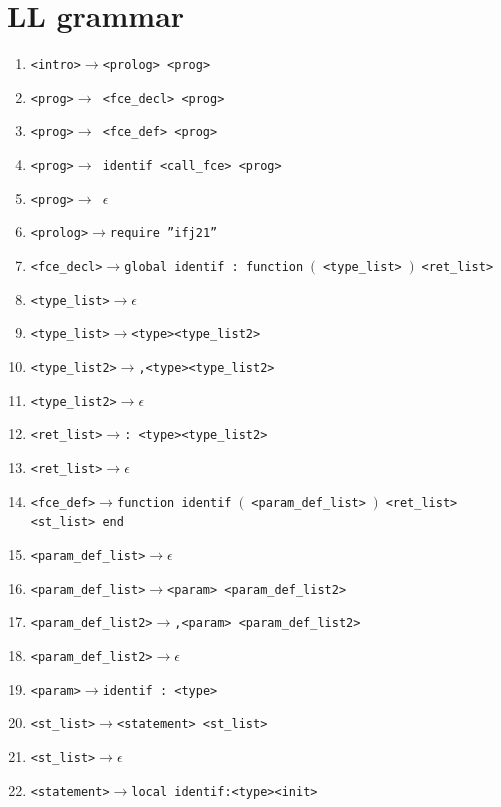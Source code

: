 \documentclass[11pt]{article}
\newcommand{\term}[1]{{\color{red}#1}}
\newcommand{\arrow}{$\rightarrow$}
\begin{document}
\section{LL grammar}
\label{LL-grammar}
\begin{enumerate}
    {\color{red}}
    \item \texttt{<intro>\arrow{}<prolog> <prog> }  
    \item \texttt{<prog>\arrow{} <fce\_decl> <prog>}
    \item \texttt{<prog>\arrow{} <fce\_def> <prog>}
    \item \texttt{<prog>\arrow{} \term{identif} <call\_fce> <prog>}
    \item \texttt{<prog>\arrow{} $\epsilon$}    
    \item \texttt{<prolog>\arrow{}\term{require} \term{''ifj21''}   }
    \item \texttt{<fce\_decl>\arrow{}\term{global} \term{identif} \term{:} \term{function} \term{$($} <type\_list> \term{$)$} <ret\_list>}
    \item \texttt{<type\_list>\arrow{}$\epsilon$}
    \item \texttt{<type\_list>\arrow{}<type><type\_list2>}
    \item \texttt{<type\_list2>\arrow{}\term{,}<type><type\_list2>} 
    \item \texttt{<type\_list2>\arrow{}$\epsilon$}
    \item \texttt{<ret\_list>\arrow{}\term{:} <type><type\_list2>}
    \item \texttt{<ret\_list>\arrow{}$\epsilon$}
    \item \texttt{<fce\_def>\arrow{}\term{function} \term{identif} \term{$($} <param\_def\_list> \term{$)$} <ret\_list> <st\_list> \term{end}}
    \item \texttt{<param\_def\_list>\arrow{}$\epsilon$}
    \item \texttt{<param\_def\_list>\arrow{}<param> <param\_def\_list2>}
    \item \texttt{<param\_def\_list2>\arrow{}\term{,}<param> <param\_def\_list2>}
    \item \texttt{<param\_def\_list2>\arrow{}$\epsilon$}
    \item \texttt{<param>\arrow{}\term{identif} \term{:} <type>}
    \item \texttt{<st\_list>\arrow{}<statement> <st\_list>}
    \item \texttt{<st\_list>\arrow{}$\epsilon$}
    \item \texttt{<statement>\arrow{}\term{local} \term{identif}\term{:}<type><init>}

\end{enumerate}
\end{document}
